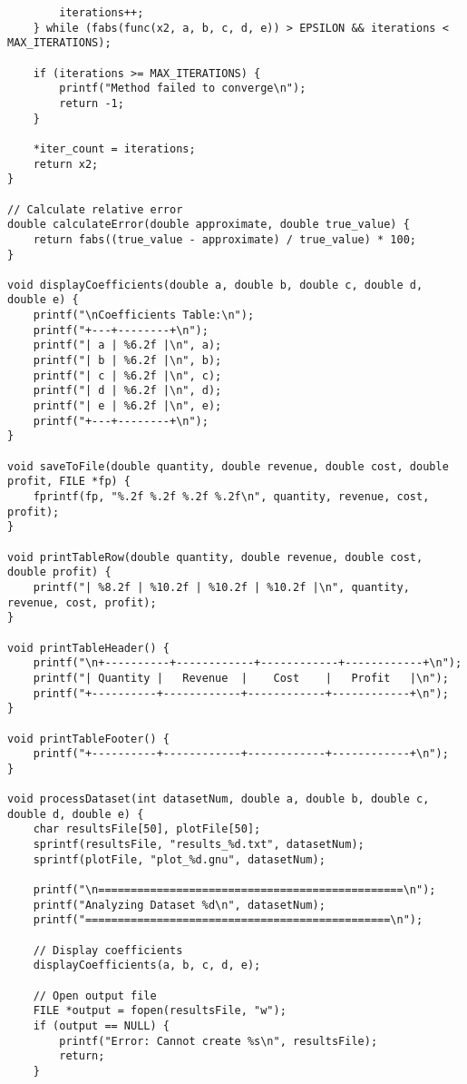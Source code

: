\documentclass[conference]{IEEEtran}
\begin{document}
\begin{verbatim}
        iterations++;
    } while (fabs(func(x2, a, b, c, d, e)) > EPSILON && iterations < MAX_ITERATIONS);
    
    if (iterations >= MAX_ITERATIONS) {
        printf("Method failed to converge\n");
        return -1;
    }
    
    *iter_count = iterations;
    return x2;
}

// Calculate relative error
double calculateError(double approximate, double true_value) {
    return fabs((true_value - approximate) / true_value) * 100;
}

void displayCoefficients(double a, double b, double c, double d, double e) {
    printf("\nCoefficients Table:\n");
    printf("+---+--------+\n");
    printf("| a | %6.2f |\n", a);
    printf("| b | %6.2f |\n", b);
    printf("| c | %6.2f |\n", c);
    printf("| d | %6.2f |\n", d);
    printf("| e | %6.2f |\n", e);
    printf("+---+--------+\n");
}

void saveToFile(double quantity, double revenue, double cost, double profit, FILE *fp) {
    fprintf(fp, "%.2f %.2f %.2f %.2f\n", quantity, revenue, cost, profit);
}

void printTableRow(double quantity, double revenue, double cost, double profit) {
    printf("| %8.2f | %10.2f | %10.2f | %10.2f |\n", quantity, revenue, cost, profit);
}

void printTableHeader() {
    printf("\n+----------+------------+------------+------------+\n");
    printf("| Quantity |   Revenue  |    Cost    |   Profit   |\n");
    printf("+----------+------------+------------+------------+\n");
}

void printTableFooter() {
    printf("+----------+------------+------------+------------+\n");
}

void processDataset(int datasetNum, double a, double b, double c, double d, double e) {
    char resultsFile[50], plotFile[50];
    sprintf(resultsFile, "results_%d.txt", datasetNum);
    sprintf(plotFile, "plot_%d.gnu", datasetNum);

    printf("\n===============================================\n");
    printf("Analyzing Dataset %d\n", datasetNum);
    printf("===============================================\n");

    // Display coefficients
    displayCoefficients(a, b, c, d, e);

    // Open output file
    FILE *output = fopen(resultsFile, "w");
    if (output == NULL) {
        printf("Error: Cannot create %s\n", resultsFile);
        return;
    }


\end{verbatim}
\end{document}
